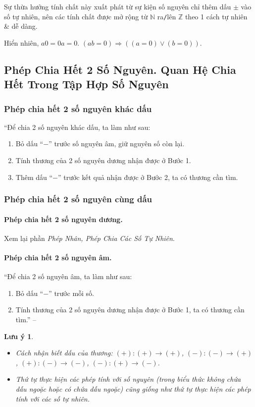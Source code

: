 \documentclass{article}
\numberwithin{equation}{section}
\newtheorem{remark}{Lưu ý}[section]
\begin{document}
Sự thừa hưởng tính chất này xuất phát từ sự kiện số nguyên chỉ thêm dấu $\pm$ vào số tự nhiên, nên các tính chất được mở rộng từ $\mathbb{N}$ ra\texttt{/}lên $\mathbb{Z}$ theo 1 cách tự nhiên \& dễ dàng.

Hiển nhiên, $a0 = 0a = 0$. $(ab = 0)\Rightarrow((a = 0)\lor(b = 0))$.

\subsection{Phép Chia Hết 2 Số Nguyên. Quan Hệ Chia Hết Trong Tập Hợp Số Nguyên}

\subsubsection{Phép chia hết 2 số nguyên khác dấu}
``Để chia 2 số nguyên khác dấu, ta làm như sau:
\begin{enumerate}
	\item Bỏ dấu ``$-$'' trước số nguyên âm, giữ nguyên số còn lại.
	\item Tính thương của 2 số nguyên dương nhận được ở Bước 1.
	\item Thêm dấu ``$-$'' trước kết quả nhận được ở Bước 2, ta có thương cần tìm.
\end{enumerate}

\subsubsection{Phép chia hết 2 số nguyên cùng dấu}

\paragraph{Phép chia hết 2 số nguyên dương.} Xem lại phần \textit{Phép Nhân, Phép Chia Các Số Tự Nhiên}.

\paragraph{Phép chia hết 2 số nguyên âm.} ``Để chia 2 số nguyên âm, ta làm như sau:
\begin{enumerate}
	\item Bỏ dấu ``$-$'' trước mỗi số.
	\item Tính thương của 2 số nguyên dương nhận được ở Bước 1, ta có thương cần tìm.'' -- \cite[p. 85]{Thai_Anh_Dat_Ha_Loan_Nam_Quang_Toan_6_tap_1}
\end{enumerate}

\begin{remark}
	\begin{itemize}
		\item Cách nhận biết dấu của thương: $(+):(+)\to(+)$, $(-):(-)\to(+)$, $(+):(-)\to(-)$, $(-):(+)\to(-)$.
		\item Thứ tự thực hiện các phép tính với số nguyên (trong biểu thức không chứa dấu ngoặc hoặc có chứa dấu ngoặc) cũng giống như thứ tự thực hiện các phép tính với các số tự nhiên.
	\end{itemize}
\end{remark}
\end{document}
